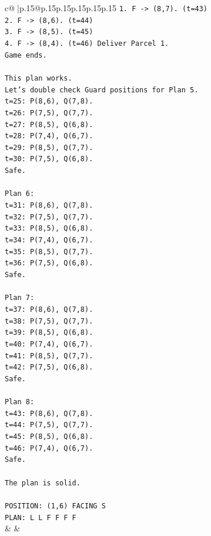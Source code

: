 \documentclass{article}
\begin{document}
{\begin{supertabular}{c@{$\;$}|p{.15\linewidth}@{}p{.15\linewidth}p{.15\linewidth}p{.15\linewidth}p{.15\linewidth}p{.15\linewidth}}
{{{\texttt{1. F {-}> (8,7). (t=43)} \\
\texttt{2. F {-}> (8,6). (t=44)} \\
\texttt{3. F {-}> (8,5). (t=45)} \\
\texttt{4. F {-}> (8,4). (t=46) Deliver Parcel 1.} \\
\texttt{Game ends.} \\
\\ 
\texttt{This plan works.} \\
\texttt{Let's double check Guard positions for Plan 5.} \\
\texttt{t=25: P(8,6), Q(7,8).} \\
\texttt{t=26: P(7,5), Q(7,7).} \\
\texttt{t=27: P(8,5), Q(6,8).} \\
\texttt{t=28: P(7,4), Q(6,7).} \\
\texttt{t=29: P(8,5), Q(7,7).} \\
\texttt{t=30: P(7,5), Q(6,8).} \\
\texttt{Safe.} \\
\\ 
\texttt{Plan 6:} \\
\texttt{t=31: P(8,6), Q(7,8).} \\
\texttt{t=32: P(7,5), Q(7,7).} \\
\texttt{t=33: P(8,5), Q(6,8).} \\
\texttt{t=34: P(7,4), Q(6,7).} \\
\texttt{t=35: P(8,5), Q(7,7).} \\
\texttt{t=36: P(7,5), Q(6,8).} \\
\texttt{Safe.} \\
\\ 
\texttt{Plan 7:} \\
\texttt{t=37: P(8,6), Q(7,8).} \\
\texttt{t=38: P(7,5), Q(7,7).} \\
\texttt{t=39: P(8,5), Q(6,8).} \\
\texttt{t=40: P(7,4), Q(6,7).} \\
\texttt{t=41: P(8,5), Q(7,7).} \\
\texttt{t=42: P(7,5), Q(6,8).} \\
\texttt{Safe.} \\
\\ 
\texttt{Plan 8:} \\
\texttt{t=43: P(8,6), Q(7,8).} \\
\texttt{t=44: P(7,5), Q(7,7).} \\
\texttt{t=45: P(8,5), Q(6,8).} \\
\texttt{t=46: P(7,4), Q(6,7).} \\
\texttt{Safe.} \\
\\ 
\texttt{The plan is solid.} \\
\\ 
\texttt{POSITION: (1,6) FACING S} \\
\texttt{PLAN: L L F F F F} \\
            }
        }
    }
    & & \\ \\


\end{supertabular}}
\end{document}
